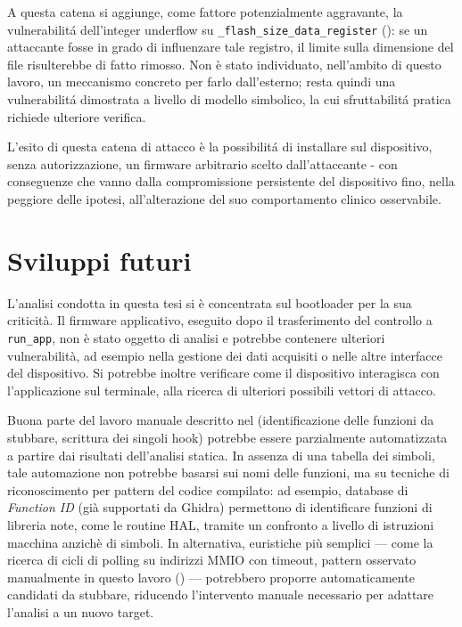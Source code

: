             A questa catena si aggiunge, come fattore potenzialmente aggravante, la vulnerabilitá dell'integer underflow su \texttt{\_flash\_size\_data\_register} (): se un attaccante fosse in grado di influenzare tale registro, il limite sulla dimensione del file risulterebbe di fatto rimosso. Non è stato individuato, nell'ambito di questo lavoro, un meccanismo concreto per farlo dall'esterno; resta quindi una vulnerabilitá dimostrata a livello di modello simbolico, la cui sfruttabilitá pratica richiede ulteriore verifica.
    
            L'esito di questa catena di attacco è la possibilitá di installare sul dispositivo, senza autorizzazione, un firmware arbitrario scelto dall'attaccante - con conseguenze che vanno dalla compromissione persistente del dispositivo fino, nella peggiore delle ipotesi, all'alterazione del suo comportamento clinico osservabile.
        
    \section{Sviluppi futuri}
    \label{subsec:sviluppi_futuri}
        L'analisi condotta in questa tesi si è concentrata sul bootloader per 
        la sua criticità. Il firmware applicativo, eseguito dopo il 
        trasferimento del controllo a \texttt{run\_app}, non è stato oggetto di 
        analisi e potrebbe contenere ulteriori vulnerabilità, ad esempio nella 
        gestione dei dati acquisiti o nelle altre interfacce del dispositivo. 
        Si potrebbe inoltre verificare come il dispositivo interagisca con 
        l'applicazione sul terminale, alla ricerca di ulteriori possibili 
        vettori di attacco.
        
        Buona parte del lavoro manuale descritto nel (identificazione 
        delle funzioni da stubbare, scrittura dei singoli hook) potrebbe essere 
        parzialmente automatizzata a partire dai risultati dell'analisi statica. 
        In assenza di una tabella dei simboli, tale automazione non potrebbe 
        basarsi sui nomi delle funzioni, ma su tecniche di riconoscimento per 
        pattern del codice compilato: ad esempio, database di \textit{Function 
        ID} (già supportati da Ghidra) permettono di identificare funzioni di 
        libreria note, come le routine HAL, tramite un confronto a livello di 
        istruzioni macchina anzichè di simboli. In alternativa, euristiche più 
        semplici — come la ricerca di cicli di polling su indirizzi MMIO con 
        timeout, pattern osservato manualmente in questo lavoro () 
        — potrebbero proporre automaticamente candidati da stubbare, riducendo 
        l'intervento manuale necessario per adattare l'analisi a un nuovo 
        target.
        
